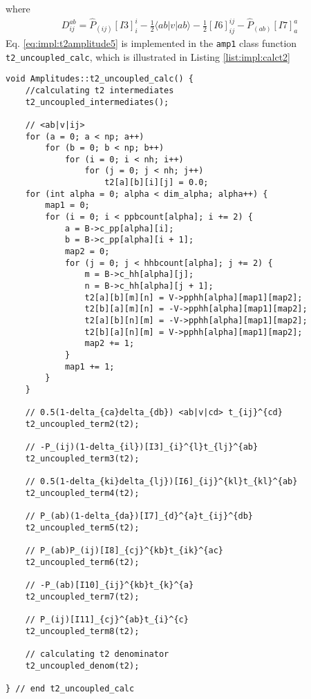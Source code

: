where
\begin{align}
D_{ij}^{ab}=\hat{P}_{(ij)}[I3]_{i}^{i}-\frac{1}{2}\langle ab|v|ab\rangle-\frac{1}{2}[I6]_{ij}^{ij}-\hat{P}_{(ab)}[I7]_{a}^{a}
\label{eq:impl:t2denom}
\end{align}
Eq. \ref{eq:impl:t2amplitude5} is implemented in the \texttt{amp1} class function \texttt{t2\_uncoupled\_calc}, which is illustrated in Listing \ref{list:impl:calct2}
%
\begin{lstlisting}[label={list:impl:calct2},caption={Implementation of the amp1 class function t2\_uncoupled\_calc()}]
void Amplitudes::t2_uncoupled_calc() {
    //calculating t2 intermediates
    t2_uncoupled_intermediates();

    // <ab|v|ij>
    for (a = 0; a < np; a++)
        for (b = 0; b < np; b++)
            for (i = 0; i < nh; i++)
                for (j = 0; j < nh; j++)
                    t2[a][b][i][j] = 0.0;
    for (int alpha = 0; alpha < dim_alpha; alpha++) {
        map1 = 0;
        for (i = 0; i < ppbcount[alpha]; i += 2) {
            a = B->c_pp[alpha][i];
            b = B->c_pp[alpha][i + 1];
            map2 = 0;
            for (j = 0; j < hhbcount[alpha]; j += 2) {
                m = B->c_hh[alpha][j];
                n = B->c_hh[alpha][j + 1];
                t2[a][b][m][n] = V->pphh[alpha][map1][map2];
                t2[b][a][m][n] = -V->pphh[alpha][map1][map2];
                t2[a][b][n][m] = -V->pphh[alpha][map1][map2];
                t2[b][a][n][m] = V->pphh[alpha][map1][map2];
                map2 += 1;
            }
            map1 += 1;
        }
    }

    // 0.5(1-delta_{ca}delta_{db}) <ab|v|cd> t_{ij}^{cd}
    t2_uncoupled_term2(t2);

    // -P_(ij)(1-delta_{il})[I3]_{i}^{l}t_{lj}^{ab}
    t2_uncoupled_term3(t2);

    // 0.5(1-delta_{ki}delta_{lj})[I6]_{ij}^{kl}t_{kl}^{ab}
    t2_uncoupled_term4(t2);

    // P_(ab)(1-delta_{da})[I7]_{d}^{a}t_{ij}^{db}
    t2_uncoupled_term5(t2);

    // P_(ab)P_(ij)[I8]_{cj}^{kb}t_{ik}^{ac}
    t2_uncoupled_term6(t2);

    // -P_(ab)[I10]_{ij}^{kb}t_{k}^{a}
    t2_uncoupled_term7(t2);

    // P_(ij)[I11]_{cj}^{ab}t_{i}^{c}
    t2_uncoupled_term8(t2);

    // calculating t2 denominator
    t2_uncoupled_denom(t2);

} // end t2_uncoupled_calc
\end{lstlisting}

